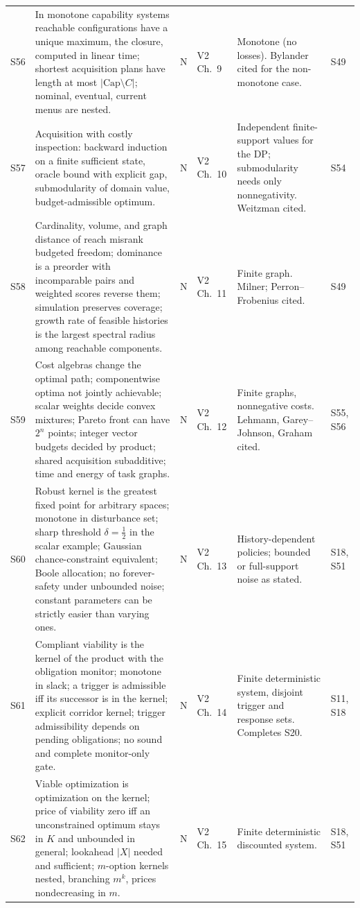 \documentclass[10pt]{article}
\begin{document}
\begin{longtable}{@{}l p{} c l p{} p{}@{}}
S56 & In monotone capability systems reachable configurations have a unique maximum, the closure, computed in linear time; shortest acquisition plans have length at most $|\mathrm{Cap}\setminus C|$; nominal, eventual, current menus are nested. & N & V2 Ch.~9 & Monotone (no losses). Bylander cited for the non-monotone case. & S49\\[3pt]
S57 & Acquisition with costly inspection: backward induction on a finite sufficient state, oracle bound with explicit gap, submodularity of domain value, budget-admissible optimum. & N & V2 Ch.~10 & Independent finite-support values for the DP; submodularity needs only nonnegativity. Weitzman cited. & S54\\[3pt]
S58 & Cardinality, volume, and graph distance of reach misrank budgeted freedom; dominance is a preorder with incomparable pairs and weighted scores reverse them; simulation preserves coverage; growth rate of feasible histories is the largest spectral radius among reachable components. & N & V2 Ch.~11 & Finite graph. Milner; Perron--Frobenius cited. & S49\\[3pt]
S59 & Cost algebras change the optimal path; componentwise optima not jointly achievable; scalar weights decide convex mixtures; Pareto front can have $2^n$ points; integer vector budgets decided by product; shared acquisition subadditive; time and energy of task graphs. & N & V2 Ch.~12 & Finite graphs, nonnegative costs. Lehmann, Garey--Johnson, Graham cited. & S55, S56\\[3pt]
S60 & Robust kernel is the greatest fixed point for arbitrary spaces; monotone in disturbance set; sharp threshold $\delta=\tfrac12$ in the scalar example; Gaussian chance-constraint equivalent; Boole allocation; no forever-safety under unbounded noise; constant parameters can be strictly easier than varying ones. & N & V2 Ch.~13 & History-dependent policies; bounded or full-support noise as stated. & S18, S51\\[3pt]
S61 & Compliant viability is the kernel of the product with the obligation monitor; monotone in slack; a trigger is admissible iff its successor is in the kernel; explicit corridor kernel; trigger admissibility depends on pending obligations; no sound and complete monitor-only gate. & N & V2 Ch.~14 & Finite deterministic system, disjoint trigger and response sets. Completes S20. & S11, S18\\[3pt]
S62 & Viable optimization is optimization on the kernel; price of viability zero iff an unconstrained optimum stays in $K$ and unbounded in general; lookahead $|X|$ needed and sufficient; $m$-option kernels nested, branching $m^k$, prices nondecreasing in $m$. & N & V2 Ch.~15 & Finite deterministic discounted system. & S18, S51\\[3pt]

\end{longtable}
\end{document}
